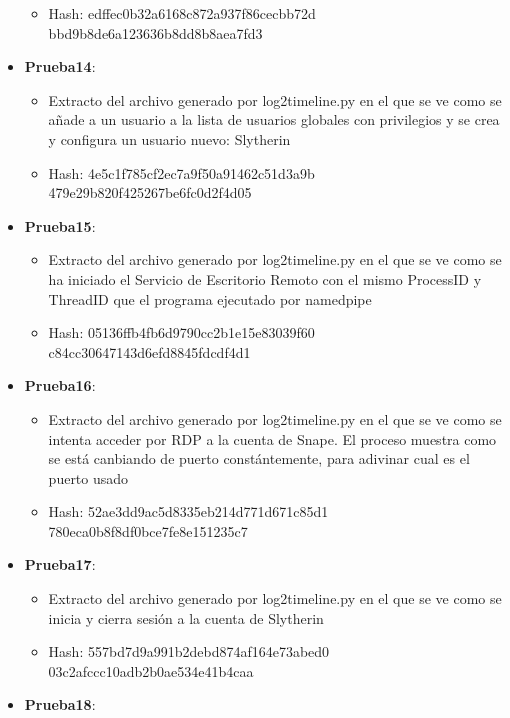\begin{itemize}
{\begin{itemize}
      \item{Hash}: edffec0b32a6168c872a937f86cecbb72d\\bbd9b8de6a123636b8dd8b8aea7fd3
    \end{itemize}}
  \item{\textbf{Prueba14}: 
    \begin{itemize}
      \item{Extracto del archivo generado por log2timeline.py en el que se ve como se añade a un usuario a la lista de usuarios globales con privilegios y se crea y configura un usuario nuevo: Slytherin}
      \item{Hash}: 4e5c1f785cf2ec7a9f50a91462c51d3a9b\\479e29b820f425267be6fc0d2f4d05
    \end{itemize}}
  \item{\textbf{Prueba15}: 
    \begin{itemize}
      \item{Extracto del archivo generado por log2timeline.py en el que se ve como se ha iniciado el Servicio de Escritorio Remoto con el mismo ProcessID y ThreadID que el programa ejecutado por namedpipe}
      \item{Hash}: 05136ffb4fb6d9790cc2b1e15e83039f60\\c84cc30647143d6efd8845fdcdf4d1
    \end{itemize}}
  \item{\textbf{Prueba16}: 
    \begin{itemize}
      \item{Extracto del archivo generado por log2timeline.py en el que se ve como se intenta acceder por \gls{RDP} a la cuenta de Snape. El proceso muestra como se está canbiando de puerto constántemente, para adivinar cual es el puerto usado}
      \item{Hash}: 52ae3dd9ac5d8335eb214d771d671c85d1\\780eca0b8f8df0bce7fe8e151235c7
    \end{itemize}}
  \item{\textbf{Prueba17}: 
    \begin{itemize}
      \item{Extracto del archivo generado por log2timeline.py en el que se ve como se inicia y cierra sesión a la cuenta de Slytherin}
      \item{Hash}: 557bd7d9a991b2debd874af164e73abed0\\03c2afccc10adb2b0ae534e41b4caa
    \end{itemize}}
  \item{\textbf{Prueba18}: 
}
\end{itemize}
